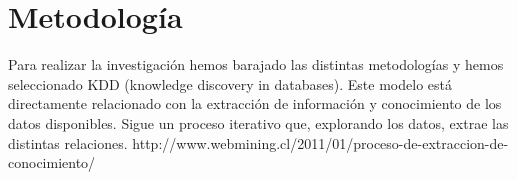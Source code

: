
\chapter{Metodología}
\label{cap:metodologia}

Para realizar la investigación hemos barajado las distintas metodologías y hemos seleccionado KDD (knowledge discovery in databases). Este modelo está directamente relacionado con la extracción de información y conocimiento de los datos disponibles. Sigue un proceso iterativo que, explorando los datos, extrae las distintas relaciones.
http://www.webmining.cl/2011/01/proceso-de-extraccion-de-conocimiento/
